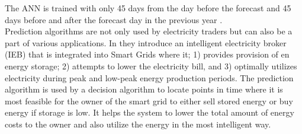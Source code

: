 The ANN is trained with only 45 days from the day before the forecast and 45 days before and after the forecast day in the previous year \cite{pjmForecast}.
\\[0.5cm]
Prediction algorithms are not only used by electricity traders but can also be a part of various applications. In \cite{22} they introduce an intelligent electricity broker (IEB) that is integrated into Smart Grids where it; 1) provides provision of en energy storage; 2) attempts to lower the electricity bill, and 3) optimally utilizes electricity during peak and low-peak energy production periods. The prediction algorithm is used by a decision algorithm to locate points in time where it is most feasible for the owner of the smart grid to either sell stored energy or buy energy if storage is low. It helps the system to lower the total amount of energy costs to the owner and also utilize the energy in the most intelligent way.